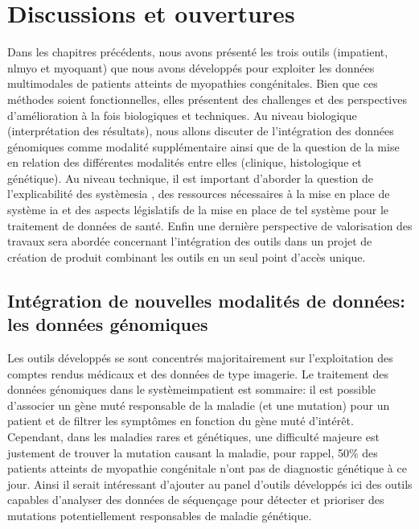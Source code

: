 \chapter{Discussions et ouvertures}
Dans les chapitres précédents, nous avons présenté les trois outils (\gls{impatient}, \gls{nlmyo} et \gls{myoquant}) que nous avons développés pour exploiter les données multimodales de patients atteints de myopathies congénitales. Bien que ces méthodes soient fonctionnelles, elles présentent des challenges et des perspectives d'amélioration à la fois biologiques et techniques. Au niveau biologique (interprétation des résultats), nous allons discuter de l'intégration des données génomiques comme modalité supplémentaire ainsi que de la question de la mise en relation des différentes modalités entre elles (clinique, histologique et génétique). Au niveau technique, il est important d'aborder la question de l'explicabilité des systèmes\gls{ia} , des ressources nécessaires à la mise en place de système \gls{ia} et des aspects législatifs de la mise en place de tel système pour le traitement de données de santé. Enfin une dernière perspective de valorisation des travaux sera abordée concernant l'intégration des outils dans un projet de création de produit combinant les outils en un seul point d'accès unique.

\section{Intégration de nouvelles modalités de données: les données génomiques}
Les outils développés se sont concentrés majoritairement sur l'exploitation des comptes rendus médicaux et des données de type imagerie. Le traitement des données génomiques dans le système\gls{impatient} est sommaire: il est possible d'associer un gène muté responsable de la maladie (et une mutation) pour un patient et de filtrer les symptômes en fonction du gène muté d'intérêt. Cependant, dans les maladies rares et génétiques, une difficulté majeure est justement de trouver la mutation causant la maladie, pour rappel, 50\% des patients atteints de myopathie congénitale n'ont pas de diagnostic génétique à ce jour. Ainsi il serait intéressant d'ajouter au panel d'outils développés ici des outils capables d'analyser des données de séquençage pour détecter et prioriser des mutations potentiellement responsables de maladie génétique. 

